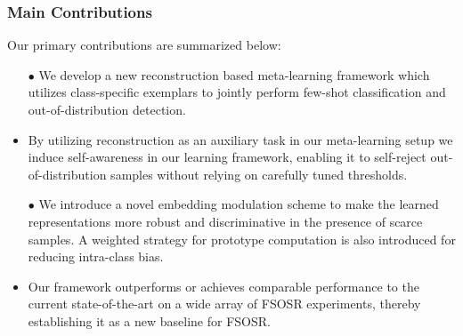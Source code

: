 \subsubsection*{Main Contributions}
Our primary contributions are summarized below:
\begin{itemize}
    \item[$\bullet$] We develop a new reconstruction based meta-learning framework which utilizes class-specific exemplars to jointly perform few-shot classification and out-of-distribution detection.
    \item By utilizing reconstruction as an auxiliary task in our meta-learning setup we induce self-awareness in our learning framework, enabling it to self-reject out-of-distribution samples without relying on carefully tuned thresholds.
    \item[$\bullet$] We introduce a novel embedding modulation scheme to make the learned representations more robust and discriminative in the presence of scarce samples. A weighted strategy for prototype computation is also introduced for reducing intra-class bias.
    \item Our framework outperforms or achieves comparable performance to the current state-of-the-art on a wide array of FSOSR experiments, thereby establishing it as a new baseline for FSOSR.
\end{itemize}


